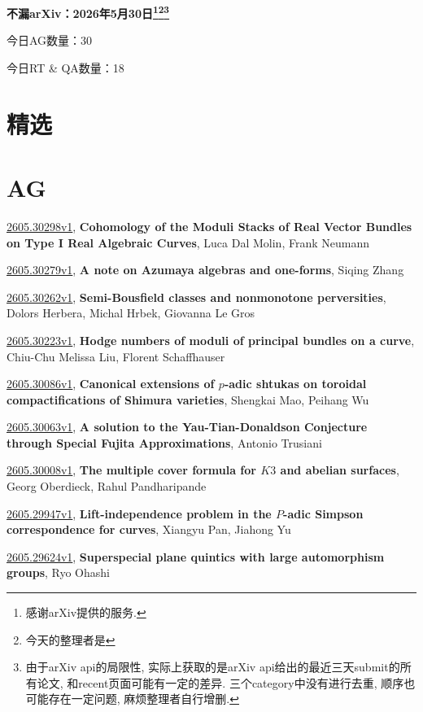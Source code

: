 \documentclass[9pt, a4paper]{article}
\theoremstyle{plain}
\theoremstyle{definition}
\theoremstyle{remark}
\newcommand{\arxiv}[3]{\href{https://arxiv.org/abs/#1}{#1}, \textbf{\textcolor{arxivblue}{#2}}, #3}
\newcommand{\AGnumber}{30}
\newcommand{\RTQAnumber}{18}
\newcommand{\NewestDate}{2026年5月30日}
\newcommand{\todayarXiver}{} %
\begin{document}
\begin{center}
    \Huge\textbf{不漏arXiv：\NewestDate\footnote{感谢arXiv提供的服务.}\footnote{今天的整理者是\todayarXiver}\footnote{由于arXiv api的局限性, 实际上获取的是arXiv api给出的最近三天submit的所有论文, 和recent页面可能有一定的差异. 三个category中没有进行去重, 顺序也可能存在一定问题, 麻烦整理者自行增删.}} \\
\end{center}

\setcounter{section}{-1}

\begin{center}
    今日AG数量：\AGnumber
    
    今日RT \& QA数量：\RTQAnumber
    
\end{center}


\section{精选}


\section{AG}
\arxiv{2605.30298v1}{Cohomology of the Moduli Stacks of Real Vector Bundles on Type I Real Algebraic Curves}{Luca Dal Molin, Frank Neumann}

\arxiv{2605.30279v1}{A note on Azumaya algebras and one-forms}{Siqing Zhang}

\arxiv{2605.30262v1}{Semi-Bousfield classes and nonmonotone perversities}{Dolors Herbera, Michal Hrbek, Giovanna Le Gros}

\arxiv{2605.30223v1}{Hodge numbers of moduli of principal bundles on a curve}{Chiu-Chu Melissa Liu, Florent Schaffhauser}

\arxiv{2605.30086v1}{Canonical extensions of $p$-adic shtukas on toroidal compactifications of Shimura varieties}{Shengkai Mao, Peihang Wu}

\arxiv{2605.30063v1}{A solution to the Yau-Tian-Donaldson Conjecture through Special Fujita Approximations}{Antonio Trusiani}

\arxiv{2605.30008v1}{The multiple cover formula for $K3$ and abelian surfaces}{Georg Oberdieck, Rahul Pandharipande}

\arxiv{2605.29947v1}{Lift-independence problem in the $P$-adic Simpson correspondence for curves}{Xiangyu Pan, Jiahong Yu}

\arxiv{2605.29624v1}{Superspecial plane quintics with large automorphism groups}{Ryo Ohashi}
\end{document}
